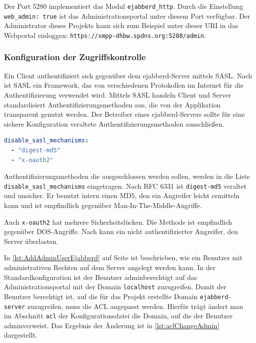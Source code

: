 \documentclass[a4paper,titlepage,halfparskip,12pt]{scrreprt}
\begin{document}
\begin{onehalfspacing}
Der Port 5280 implementiert das Modul \texttt{ejabberd\_http}. Durch die Einstellung \texttt{web\_admin: true} ist das Administrationsportal unter diesem Port verfügbar. Der Administrator dieses Projekts kann sich zum Beispiel unter dieser \ac{URI} in das Webportal einloggen: \texttt{https://xmpp-dhbw.spdns.org:5280/admin}.


\subsubsection*{Konfiguration der Zugriffskontrolle}

Ein Client authentifiziert sich gegenüber dem ejabberd-Server mittels \ac{SASL}. Nach \cite{SASLDescription} ist \ac{SASL} ein Framework, das von verschiedenen Protokollen im Internet für die Authentifizierung verwendet wird. Mittels \ac{SASL} handeln Client und Server standardisiert Authentifizierungsmethoden aus, die von der Applikation transparent genutzt werden.  Der Betreiber eines ejabberd-Servers sollte für eine sichere Konfiguration veraltete Authentifizierungsmethoden ausschließen.  

\bigskip

\begin{lstlisting}[language=yaml, caption={Ausschluss unsicherer Authentifizierungsmethoden}]
disable_sasl_mechanisms:
  - "digest-md5"
  - "x-oauth2"
\end{lstlisting}

Authentifizierungsmethoden die ausgeschlossen werden sollen, werden in die Liste \texttt{disable\_sasl\_mechanisms} eingetragen. Nach \ac{RFC} 6331 ist \texttt{digest-md5} veraltet und unsicher. Er benutzt intern einen \ac{MD5}, den ein Angreifer leicht ermitteln kann und ist empfindlich gegenüber Man-In-The-Middle-Angriffe.\cite{DigestMD5Vulnerabilty}

Auch \texttt{x-oauth2} hat mehrere Sicherheitslücken. Die Methode ist empfindlich gegenüber \ac{DOS}-Angriffe. Nach \cite{xOAuthVulnerabilty} kann ein nicht authentifizierter Angreifer, den Server überlasten.

In \autoref{lst:AddAdminUserEjabberd} auf Seite \pageref{lst:AddAdminUserEjabberd} ist beschrieben, wie ein Benutzer mit administrativen Rechten auf dem Server angelegt werden kann. In der Standardkonfiguration ist der Benutzer \glqq admin\grqq berechtigt auf das Administrationsportal mit der Domain \texttt{localhost} zuzugreifen. Damit der Benutzer berechtigt ist, auf die für das Projekt erstellte Domain \texttt{ejabberd-server} zuzugreifen, muss die \ac{ACL} angepasst werden. Hierfür trägt ändert man im Abschnitt \texttt{acl} der Konfigurationsdatei die Domain, auf die der Benutzer \glqq admin\grqq verweist. Das Ergebnis der Änderung ist in \autoref{lst:aclChangeAdmin} dargestellt.


\end{onehalfspacing}
\end{document}
